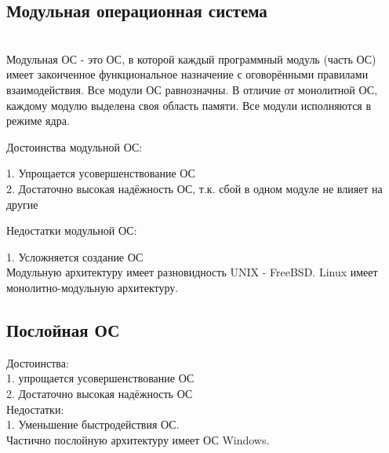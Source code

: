 \documentclass[a4paper]{article}
\begin{document}
\subsection{Модульная операционная система}
\setcounter{2}\\
Модульная ОС - это ОС, в которой каждый программный модуль (часть ОС) имеет законченное функциональное назначение с оговорёнными правилами взаимодействия. Все модули ОС равнозначны. В отличие от монолитной ОС, каждому модулю выделена своя область памяти. Все модули исполняются в режиме ядра.\\
\begin{center}
	Достоинства модульной ОС:
\end{center}
1. Упрощается усовершенствование ОС\\
2. Достаточно высокая надёжность ОС, т.к. сбой в одном модуле не влияет на другие\\
\begin{center}
	Недостатки модульной ОС:
\end{center}
1. Усложняется создание ОС\\
Модульную архитектуру имеет разновидность UNIX - FreeBSD.
Linux имеет монолитно-модульную архитектуру.
\subsection{Послойная ОС}
Достоинства:\\
1. упрощается усовершенствование ОС\\
2. Достаточно высокая надёжность ОС\\
Недостатки:\\
1. Уменьшение быстродействия ОС.\\
Частично послойную архитектуру имеет ОС Windows.
\end{document}
